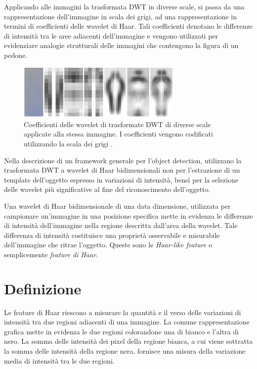         Applicando alle immagini la trasformata DWT in diverse scale, si passa da una rappresentazione dell'immagine in scala dei grigi, ad una rappresentazione in termini di coefficienti delle wavelet di Haar.
        Tali coefficienti denotano le differenze di intensità tra le aree adiacenti dell'immagine e vengono utilizzati per evidenziare analogie strutturali delle immagini che contengono la figura di un pedone.

        \begin{figure}
            \centering
            \includegraphics[width=8cm]{img/pedestrian_dwt.png}
            \caption{Coefficienti delle wavelet di trasformate DWT di diverse scale applicate alla stessa immagine. I coefficienti vengono codificati utilizzando la scala dei grigi \cite[Figura 3]{Oren97}.}
            \label{fig:non_standard_dwt}
        \end{figure}

        Nella descrizione di un framework generale per l'object detection, \citet{Papageorgiou98} utilizzano la trasformata DWT a wavelet di Haar bidimensionali non per l'estrazione di un template dell'oggetto espresso in variazioni di intensità, bensì per la selezione delle wavelet più significative al fine del riconoscimento dell'oggetto.

        Una wavelet di Haar bidimensionale di una data dimensione, utilizzata per campionare un'immagine in una posizione specifica mette in evidenza le differenze di intensità dell'immagine nella regione descritta dall'area della wavelet. Tale differenza di intensità costituisce una proprietà osservabile e misurabile dell'immagine che ritrae l'oggetto. Queste sono le \emph{Haar-like feature} o semplicemente \emph{feature di Haar}.

    \section{Definizione} %
    \label{sec:definizione}
        Le feature di Haar riescono a misurare la quantità e il verso delle variazioni di intensità tra due regioni adiacenti di una immagine.
        La comune rappresentazione grafica mette in evidenza le due regioni colorandone una di bianco e l'altra di nero.
        La somma delle intensità dei pixel della regione bianca, a cui viene sottratta la somma delle intensità della regione nera, fornisce una misura della variazione media di intensità tra le due regioni.

